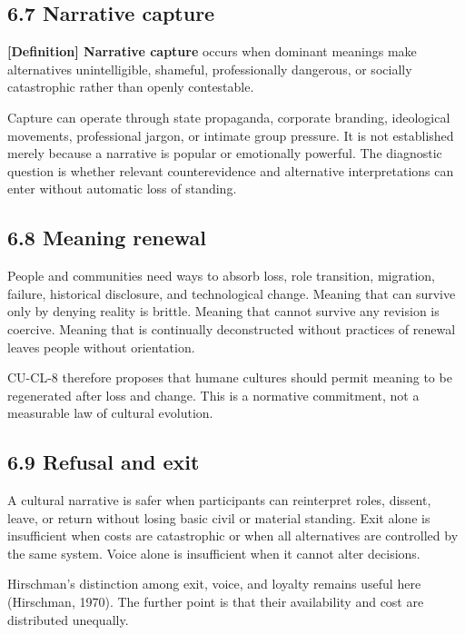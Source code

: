 \documentclass[
  11pt,
]{article}
\begin{document}
\subsection{6.7 Narrative capture}\label{narrative-capture}

\textbf{{[}Definition{]} Narrative capture} occurs when dominant
meanings make alternatives unintelligible, shameful, professionally
dangerous, or socially catastrophic rather than openly contestable.

Capture can operate through state propaganda, corporate branding,
ideological movements, professional jargon, or intimate group pressure.
It is not established merely because a narrative is popular or
emotionally powerful. The diagnostic question is whether relevant
counterevidence and alternative interpretations can enter without
automatic loss of standing.

\subsection{6.8 Meaning renewal}\label{meaning-renewal}

People and communities need ways to absorb loss, role transition,
migration, failure, historical disclosure, and technological change.
Meaning that can survive only by denying reality is brittle. Meaning
that cannot survive any revision is coercive. Meaning that is
continually deconstructed without practices of renewal leaves people
without orientation.

CU-CL-8 therefore proposes that humane cultures should permit meaning to
be regenerated after loss and change. This is a normative commitment,
not a measurable law of cultural evolution.

\subsection{6.9 Refusal and exit}\label{refusal-and-exit}

A cultural narrative is safer when participants can reinterpret roles,
dissent, leave, or return without losing basic civil or material
standing. Exit alone is insufficient when costs are catastrophic or when
all alternatives are controlled by the same system. Voice alone is
insufficient when it cannot alter decisions.

Hirschman's distinction among exit, voice, and loyalty remains useful
here (Hirschman, 1970). The further point is that their availability and
cost are distributed unequally.
\end{document}
